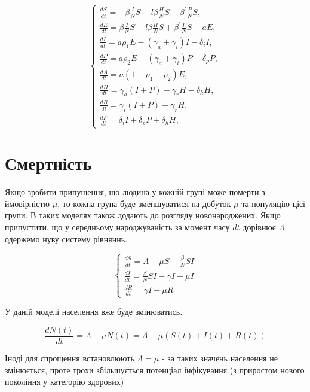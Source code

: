 \begin{equation*}
    \left\{\begin{array}{l}
    \frac{d S}{d t}=-\beta \frac{I}{N} S-l \beta \frac{H}{N} S-\beta^{\prime} \frac{P}{N} S, \\
    \frac{d E}{d t}=\beta \frac{I}{N} S+l \beta \frac{H}{N} S+\beta^{\prime} \frac{P}{N} S- a E, \\
    \frac{d I}{d t}= a \rho_1 E-\left(\gamma_a+\gamma_i\right) I-\delta_i I, \\
    \frac{d P}{d t}= a\rho_2 E-\left(\gamma_a+\gamma_i\right) P-\delta_p P, \\
    \frac{d A}{d t}= a\left(1-\rho_1-\rho_2\right) E, \\
    \frac{d H}{d t}=\gamma_a(I+P)-\gamma_r H-\delta_h H, \\
    \frac{d R}{d t}=\gamma_i(I+P)+\gamma_r H, \\
    \frac{d F}{d t}=\delta_i I+\delta_p P+\delta_h H,
    \end{array}\right.
\end{equation*}

\section{Смертність}

Якщо зробити припущення, що людина у кожній групі може померти з ймовірністю $\mu$, то кожна група буде зменшуватися на добуток $\mu$ та популяцію цієї групи. 
В таких моделях також додають до розгляду новонароджених. Якщо припустити, 
що у середньому народжуваність за момент часу $dt$ дорівнює $\Lambda$, 
одержемо нуву систему рівняннь.  


\begin{equation*}
    \begin{cases}
        \frac{dS}{dt} = \Lambda -  \mu S - \frac{\beta}{N}SI  \\
        \frac{dI}{dt} = \frac{\beta}{N}SI - \gamma I -  \mu I \\
        \frac{dR}{dt} = \gamma I -  \mu R
    \end{cases}
\end{equation*}


У даній моделі населення вже буде змінюватись.

\begin{equation*}
    \frac{dN(t)}{dt} = \Lambda - \mu N(t) = \Lambda - \mu (S(t) + I(t) + R(t))
\end{equation*}


Іноді для спрощення встановлюють $ \Lambda = \mu $ - за таких значень 
населення не змінюється, проте трохи збільшується потенціал інфікування (з приростом нового покоління у категорію здорових)




